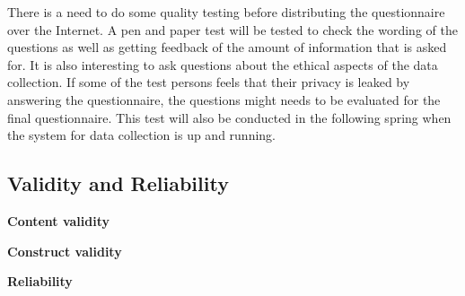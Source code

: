     There is a need to do some quality testing before distributing the questionnaire over the Internet. A pen and paper test will be tested to check the wording of the questions as well as getting feedback of the amount of information that is asked for. It is also interesting to ask questions about the ethical aspects of the data collection. If some of the test persons feels that their privacy is leaked by answering the questionnaire, the questions might needs to be evaluated for the final questionnaire. 
    This test will also be conducted in the following spring when the system for data collection is up and running. 


  \subsection{Validity and Reliability}\label{sec:validityandreliability}

    {\bf Content validity}

    {\bf Construct validity}

    {\bf Reliability}


